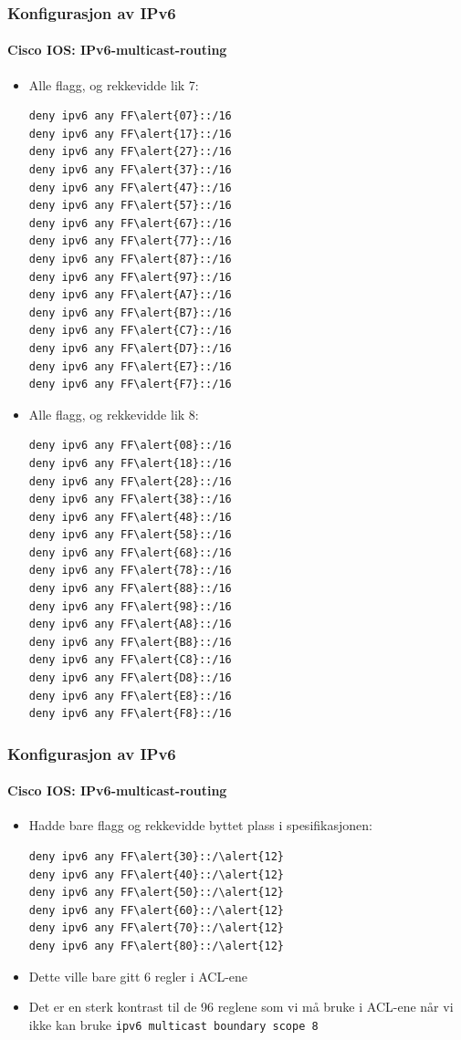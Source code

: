 \begin{frame}[fragile]%
  \frametitle{Konfigurasjon av IPv6}
  \framesubtitle{Cisco IOS: IPv6-multicast-routing}
  \begin{multicols}{2}
    \begin{itemize}%
    \item Alle flagg, og rekkevidde lik 7:
\begin{Verbatim}[commandchars=\\\{\},fontsize=\scriptsize]
deny ipv6 any FF\alert{07}::/16
deny ipv6 any FF\alert{17}::/16
deny ipv6 any FF\alert{27}::/16
deny ipv6 any FF\alert{37}::/16
deny ipv6 any FF\alert{47}::/16
deny ipv6 any FF\alert{57}::/16
deny ipv6 any FF\alert{67}::/16
deny ipv6 any FF\alert{77}::/16
deny ipv6 any FF\alert{87}::/16
deny ipv6 any FF\alert{97}::/16
deny ipv6 any FF\alert{A7}::/16
deny ipv6 any FF\alert{B7}::/16
deny ipv6 any FF\alert{C7}::/16
deny ipv6 any FF\alert{D7}::/16
deny ipv6 any FF\alert{E7}::/16
deny ipv6 any FF\alert{F7}::/16
\end{Verbatim}
    \item Alle flagg, og rekkevidde lik 8:
\begin{Verbatim}[commandchars=\\\{\},fontsize=\scriptsize]
deny ipv6 any FF\alert{08}::/16
deny ipv6 any FF\alert{18}::/16
deny ipv6 any FF\alert{28}::/16
deny ipv6 any FF\alert{38}::/16
deny ipv6 any FF\alert{48}::/16
deny ipv6 any FF\alert{58}::/16
deny ipv6 any FF\alert{68}::/16
deny ipv6 any FF\alert{78}::/16
deny ipv6 any FF\alert{88}::/16
deny ipv6 any FF\alert{98}::/16
deny ipv6 any FF\alert{A8}::/16
deny ipv6 any FF\alert{B8}::/16
deny ipv6 any FF\alert{C8}::/16
deny ipv6 any FF\alert{D8}::/16
deny ipv6 any FF\alert{E8}::/16
deny ipv6 any FF\alert{F8}::/16
\end{Verbatim}
    \end{itemize}
  \end{multicols}
\end{frame}

\begin{frame}[fragile]%
  \frametitle{Konfigurasjon av IPv6}
  \framesubtitle{Cisco IOS: IPv6-multicast-routing}
  \begin{itemize}%
    \item Hadde bare flagg og rekkevidde byttet plass i spesifikasjonen:
\begin{Verbatim}[commandchars=\\\{\}]
deny ipv6 any FF\alert{30}::/\alert{12}
deny ipv6 any FF\alert{40}::/\alert{12}
deny ipv6 any FF\alert{50}::/\alert{12}
deny ipv6 any FF\alert{60}::/\alert{12}
deny ipv6 any FF\alert{70}::/\alert{12}
deny ipv6 any FF\alert{80}::/\alert{12}
\end{Verbatim}
    \item Dette ville bare gitt 6 regler i ACL-ene
    \item Det er en sterk kontrast til de 96 reglene som vi må bruke i
      ACL-ene når vi ikke kan bruke \texttt{ipv6 multicast boundary
        scope 8}
  \end{itemize}
\end{frame}


